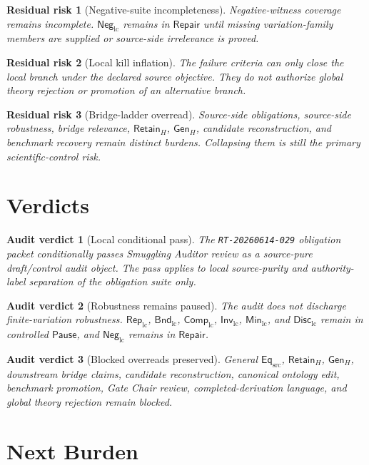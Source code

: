 \documentclass[11pt]{article}
\newcommand{\EqSrc}{\mathsf{Eq}_{\mathrm{src}}}
\newcommand{\RepLC}{\mathsf{Rep}_{\mathrm{lc}}}
\newcommand{\BndLC}{\mathsf{Bnd}_{\mathrm{lc}}}
\newcommand{\CompLC}{\mathsf{Comp}_{\mathrm{lc}}}
\newcommand{\InvLC}{\mathsf{Inv}_{\mathrm{lc}}}
\newcommand{\MinLC}{\mathsf{Min}_{\mathrm{lc}}}
\newcommand{\DiscLC}{\mathsf{Disc}_{\mathrm{lc}}}
\newcommand{\NegLC}{\mathsf{Neg}_{\mathrm{lc}}}
\newcommand{\RetainH}{\mathsf{Retain}_{H}}
\newcommand{\GenH}{\mathsf{Gen}_{H}}
\newcommand{\Pause}{\mathsf{Pause}}
\newcommand{\Repair}{\mathsf{Repair}}
\newtheorem{residualrisk}{Residual risk}
\newtheorem{verdict}{Audit verdict}
\begin{document}
\begin{residualrisk}[Negative-suite incompleteness]
Negative-witness coverage remains incomplete. \(\NegLC\) remains in
\(\Repair\) until missing variation-family members are supplied or
source-side irrelevance is proved.
\end{residualrisk}

\begin{residualrisk}[Local kill inflation]
The failure criteria can only close the local branch under the declared
source objective. They do not authorize global theory rejection or
promotion of an alternative branch.
\end{residualrisk}

\begin{residualrisk}[Bridge-ladder overread]
Source-side obligations, source-side robustness, bridge relevance,
\(\RetainH\), \(\GenH\), candidate reconstruction, and benchmark
recovery remain distinct burdens. Collapsing them is still the primary
scientific-control risk.
\end{residualrisk}

\section{Verdicts}

\begin{verdict}[Local conditional pass]
The \texttt{RT-20260614-029} obligation packet conditionally passes
Smuggling Auditor review as a source-pure draft/control audit object.
The pass applies to local source-purity and authority-label separation
of the obligation suite only.
\end{verdict}

\begin{verdict}[Robustness remains paused]
The audit does not discharge finite-variation robustness.
\(\RepLC\), \(\BndLC\), \(\CompLC\), \(\InvLC\), \(\MinLC\), and
\(\DiscLC\) remain in controlled \(\Pause\), and \(\NegLC\) remains in
\(\Repair\).
\end{verdict}

\begin{verdict}[Blocked overreads preserved]
General \(\EqSrc\), \(\RetainH\), \(\GenH\), downstream bridge claims,
candidate reconstruction, canonical ontology edit, benchmark promotion,
Gate Chair review, completed-derivation language, and global theory
rejection remain blocked.
\end{verdict}

\section{Next Burden}
\end{document}
